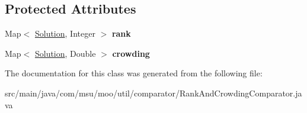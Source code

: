 \subsection*{Protected Attributes}
\begin{DoxyCompactItemize}
\item 
\hypertarget{classcom_1_1msu_1_1moo_1_1util_1_1comparator_1_1RankAndCrowdingComparator_a1c755c06b7e2fbb5c291104be31241ed}{Map$<$ \hyperlink{classcom_1_1msu_1_1moo_1_1model_1_1solution_1_1Solution}{Solution}, Integer $>$ {\bfseries rank}}\label{classcom_1_1msu_1_1moo_1_1util_1_1comparator_1_1RankAndCrowdingComparator_a1c755c06b7e2fbb5c291104be31241ed}

\item 
\hypertarget{classcom_1_1msu_1_1moo_1_1util_1_1comparator_1_1RankAndCrowdingComparator_a313221f41fa182076e22e6ea3f884b76}{Map$<$ \hyperlink{classcom_1_1msu_1_1moo_1_1model_1_1solution_1_1Solution}{Solution}, Double $>$ {\bfseries crowding}}\label{classcom_1_1msu_1_1moo_1_1util_1_1comparator_1_1RankAndCrowdingComparator_a313221f41fa182076e22e6ea3f884b76}

\end{DoxyCompactItemize}


The documentation for this class was generated from the following file\-:\begin{DoxyCompactItemize}
\item 
src/main/java/com/msu/moo/util/comparator/Rank\-And\-Crowding\-Comparator.\-java\end{DoxyCompactItemize}
